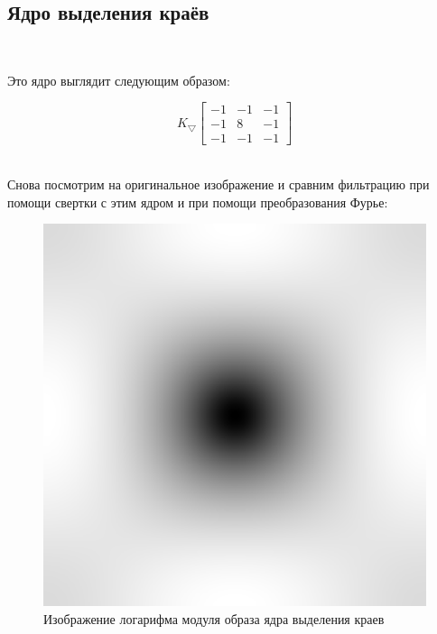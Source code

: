 \documentclass[a4paper]{article}
\begin{document}
\subsection{Ядро выделения краёв}\ 

Это ядро выглядит следующим образом:

$$K_\bigtriangledown
\begin{bmatrix}
    -1 & -1 & -1 \\
    -1 & 8 & -1 \\
    -1 & -1 & -1
\end{bmatrix}
$$\

Снова посмотрим на оригинальное изображение и сравним фильтрацию при помощи свертки с этим ядром и при помощи преобразования Фурье:

\begin{figure}[H]
    \centering
    \includegraphics[width=0.47\linewidth]{2/abs_fourier_log_norm_edge.png}
    \caption{Изображение логарифма модуля образа ядра выделения краев}
\end{figure}\noindent
\end{document}
